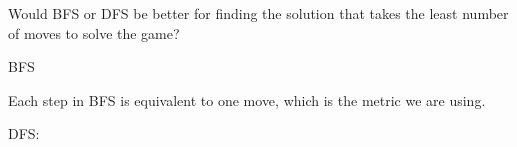 \begin{blocksection}
\question Would BFS or DFS be better for finding the solution that takes the
least number of moves to solve the game?

\begin{solution}[0.25in]
BFS

Each step in BFS is equivalent to one move, which is the metric we are using.

DFS:


\end{solution}
\end{blocksection}

